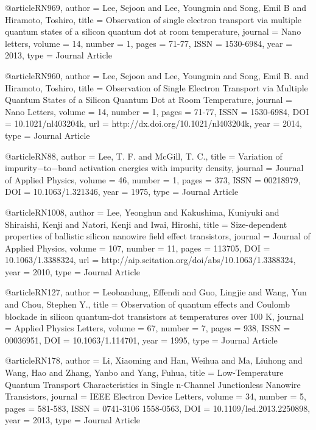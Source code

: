 @article{RN969,
   author = {Lee, Sejoon and Lee, Youngmin and Song, Emil B and Hiramoto, Toshiro},
   title = {Observation of single electron transport via multiple quantum states of a silicon quantum dot at room temperature},
   journal = {Nano letters},
   volume = {14},
   number = {1},
   pages = {71-77},
   ISSN = {1530-6984},
   year = {2013},
   type = {Journal Article}
}

@article{RN960,
   author = {Lee, Sejoon and Lee, Youngmin and Song, Emil B. and Hiramoto, Toshiro},
   title = {Observation of Single Electron Transport via Multiple Quantum States of a Silicon Quantum Dot at Room Temperature},
   journal = {Nano Letters},
   volume = {14},
   number = {1},
   pages = {71-77},
   ISSN = {1530-6984},
   DOI = {10.1021/nl403204k},
   url = {http://dx.doi.org/10.1021/nl403204k},
   year = {2014},
   type = {Journal Article}
}

@article{RN88,
   author = {Lee, T. F. and McGill, T. C.},
   title = {Variation of impurity−to−band activation energies with impurity density},
   journal = {Journal of Applied Physics},
   volume = {46},
   number = {1},
   pages = {373},
   ISSN = {00218979},
   DOI = {10.1063/1.321346},
   year = {1975},
   type = {Journal Article}
}

@article{RN1008,
   author = {Lee, Yeonghun and Kakushima, Kuniyuki and Shiraishi, Kenji and Natori, Kenji and Iwai, Hiroshi},
   title = {Size-dependent properties of ballistic silicon nanowire field effect transistors},
   journal = {Journal of Applied Physics},
   volume = {107},
   number = {11},
   pages = {113705},
   DOI = {10.1063/1.3388324},
   url = {http://aip.scitation.org/doi/abs/10.1063/1.3388324},
   year = {2010},
   type = {Journal Article}
}

@article{RN127,
   author = {Leobandung, Effendi and Guo, Lingjie and Wang, Yun and Chou, Stephen Y.},
   title = {Observation of quantum effects and Coulomb blockade in silicon quantum-dot transistors at temperatures over 100 K},
   journal = {Applied Physics Letters},
   volume = {67},
   number = {7},
   pages = {938},
   ISSN = {00036951},
   DOI = {10.1063/1.114701},
   year = {1995},
   type = {Journal Article}
}

@article{RN178,
   author = {Li, Xiaoming and Han, Weihua and Ma, Liuhong and Wang, Hao and Zhang, Yanbo and Yang, Fuhua},
   title = {Low-Temperature Quantum Transport Characteristics in Single n-Channel Junctionless Nanowire Transistors},
   journal = {IEEE Electron Device Letters},
   volume = {34},
   number = {5},
   pages = {581-583},
   ISSN = {0741-3106
1558-0563},
   DOI = {10.1109/led.2013.2250898},
   year = {2013},
   type = {Journal Article}
}

